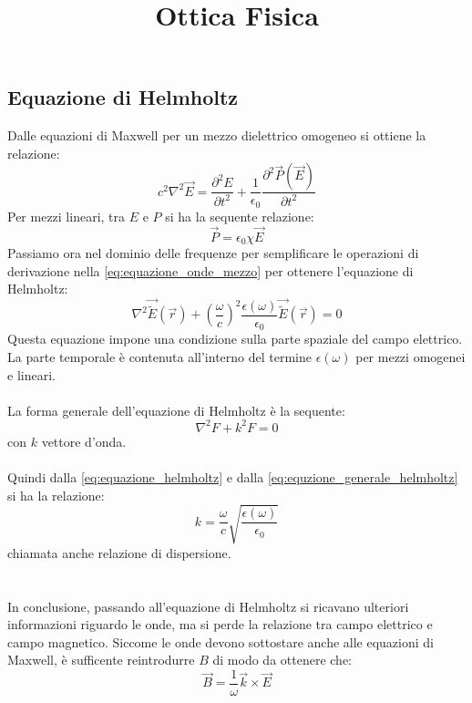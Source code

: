 \documentclass{article}
\title{Ottica Fisica}
\author{}
\date{}
\begin{document}
\maketitle

\subsection*{Equazione di Helmholtz}
Dalle equazioni di Maxwell per un mezzo dielettrico omogeneo si ottiene la relazione:
\begin{equation} \label{eq:equazione_onde_mezzo}
c^2\nabla^2 \overrightarrow{E} = \frac{\partial^2 E}{\partial t^2} + \frac{1}{\epsilon_0} \frac{\partial^2 \overrightarrow{P}(\overrightarrow{E})}{\partial t^2}
\end{equation}
Per mezzi lineari, tra $E$ e $P$ si ha la sequente relazione:
\begin{equation*}
\overrightarrow{P} = \epsilon_0 \chi \overrightarrow{E}
\end{equation*}
Passiamo ora nel dominio delle frequenze per semplificare le operazioni di derivazione nella \eqref{eq:equazione_onde_mezzo} per ottenere l'equazione di Helmholtz:
\begin{equation}	\label{eq:equazione_helmholtz}
\nabla^2 \overrightarrow{\tilde{E}}(\overrightarrow{r}) + \left(\frac{\omega}{c}\right)^2 \frac{\epsilon(\omega)}{\epsilon_0} \overrightarrow{\tilde{E}}(\overrightarrow{r}) = 0
\end{equation}
Questa equazione impone una condizione sulla parte spaziale del campo elettrico. La parte temporale è contenuta all'interno del termine $\epsilon(\omega)$ per mezzi omogenei e lineari.\\
\\
La forma generale dell'equazione di Helmholtz è la sequente:
\begin{equation} 	\label{eq:equzione_generale_helmholtz}
\nabla^2 F + k^2 F = 0
\end{equation}
con $k$ vettore d'onda.\\
\\
Quindi dalla \eqref{eq:equazione_helmholtz} e dalla \eqref{eq:equzione_generale_helmholtz} si ha la relazione:
\begin{equation*}
k = \frac{\omega}{c} \sqrt{\frac{\epsilon(\omega)}{\epsilon_0}}
\end{equation*}
chiamata anche relazione di dispersione.\\
\\
\\
In conclusione, passando all'equazione di Helmholtz si ricavano ulteriori informazioni riguardo le onde, ma si perde la relazione tra campo elettrico e campo magnetico. Siccome le onde devono sottostare anche alle equazioni di Maxwell, è sufficente reintrodurre $B$ di modo da ottenere che:
\begin{equation*}
\overrightarrow{B} = \frac{1}{\omega} \overrightarrow{k} \times \overrightarrow{E}
\end{equation*}
\end{document}
